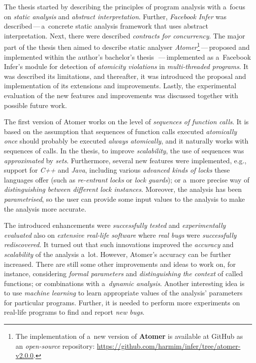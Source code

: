 The thesis started by describing the principles of program analysis with a~focus on \emph{static analysis} and \emph{abstract interpretation}. Further, \emph{Facebook Infer} was described\,---\,a~concrete static analysis framework that uses abstract interpretation. Next, there were described \emph{contracts for concurrency}. The major part of the thesis then aimed to describe static analyser \emph{Atomer}\footnote{The implementation of a~new version of \textbf{Atomer} is available at GitHub as an \emph{open-source} repository: \url{https://github.com/harmim/infer/tree/atomer-v2.0.0}.}\,---\,proposed and implemented within the author's bachelor's thesis~\cite{harmimBP}\,---\,implemented as a~Facebook Infer's module for detection of \emph{atomicity violations} in \emph{multi-threaded programs}. It was described its limitations, and thereafter, it was introduced the proposal and implementation of its extensions and improvements. Lastly, the experimental evaluation of the new features and improvements was discussed together with possible future work.

\vspace{-.2em}

The first version of Atomer works on the level of \emph{sequences of function calls}. It is based on the assumption that sequences of function calls executed \emph{atomically once} should probably be executed \emph{always atomically}, and it naturally works with sequences of calls. In the thesis, to improve \emph{scalability}, the use of sequences was \emph{approximated} by \emph{sets}. Furthermore, several new features were implemented, e.g., support for \emph{C++} and \emph{Java}, including various \emph{advanced kinds of locks} these languages offer (such as \emph{re-entrant locks} or \emph{lock guards}); or a~more precise way of \emph{distinguishing between different lock instances}. Moreover, the analysis has been \emph{parametrised}, so the user can provide some input values to the analysis to make the analysis more accurate.

\vspace{-.2em}

The introduced enhancements were \emph{successfully tested} and \emph{experimentally evaluated} also on \emph{extensive real-life software} where \emph{real bugs} were \emph{successfully rediscovered}. It turned out that such innovations improved the \emph{accuracy} and \emph{scalability} of the analysis a~lot. However, Atomer's accuracy can be further increased. There are still some other improvements and ideas to work on, for instance, considering \emph{formal parameters} and \emph{distinguishing the context} of called functions; or combinations with a~\emph{dynamic analysis}. Another interesting idea is to use \emph{machine learning} to learn appropriate values of the analysis' parameters for particular programs. Further, it is needed to perform more experiments on real-life programs to find and report \emph{new bugs}.


